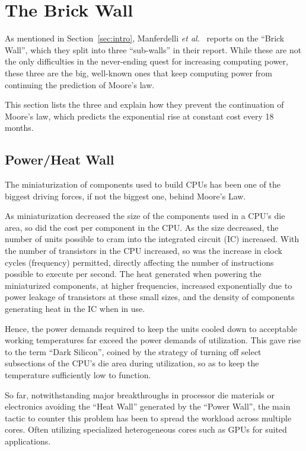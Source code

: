 
\section{The Brick Wall}
\label{sec:background}

As mentioned in Section~\ref{sec:intro}, Manferdelli \textit{et al.}~\cite{4484943} reports on the ``Brick Wall'', which they split into three ``sub-walls'' in their report.
While these are not the only difficulties in the never-ending quest for increasing computing power, these three are the big, well-known ones that keep computing power from continuing the prediction of Moore's law.

This section lists the three and explain how they prevent the continuation of Moore's law, which predicts the exponential rise at constant cost every 18 months.


\subsection{Power/Heat Wall}

The miniaturization of components used to build CPUs has been one of the biggest driving forces, if not the biggest one, behind Moore's Law.

As miniaturization decreased the size of the components used in a CPU's die area, so did the cost per component in the CPU.
As the size decreased, the number of units possible to cram into the integrated circuit (IC) increased.
With the number of transistors in the CPU increased, so was the increase in clock cycles (frequency) permitted, directly affecting the number of instructions possible to execute per second.
The heat generated when powering the miniaturized components, at higher frequencies, increased exponentially due to power leakage of transistors at these small sizes, and the density of components generating heat in the IC when in use.

Hence, the power demands required to keep the units cooled down to acceptable working temperatures far exceed the power demands of utilization.
This gave rise to the term ``Dark Silicon'', coined by the strategy of turning off select subsections of the CPU's die area during utilization, so as to keep the temperature sufficiently low to function.

So far, notwithstanding major breakthroughs in processor die materials or electronics avoiding the ``Heat Wall'' generated by the ``Power Wall'', the main tactic to counter this problem has been to spread the workload across multiple cores.
Often utilizing specialized heterogeneous cores such as GPUs for suited applications.

